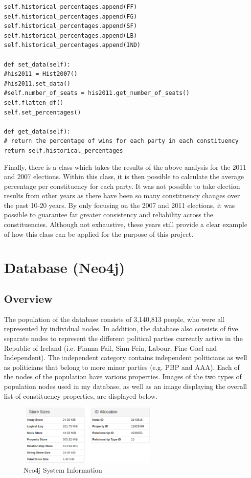 \begin{verbatim}
self.historical_percentages.append(FF)
self.historical_percentages.append(FG)
self.historical_percentages.append(SF)
self.historical_percentages.append(LB)
self.historical_percentages.append(IND)

def set_data(self):
#his2011 = Hist2007()
#his2011.set_data()
#self.number_of_seats = his2011.get_number_of_seats()
self.flatten_df()
self.set_percentages()

def get_data(self):
# return the percentage of wins for each party in each constituency
return self.historical_percentages 
\end{verbatim}
Finally, there is a class which takes the results of the above analysis for the 2011 and 2007 elections. Within this class, it is then possible to calculate the average percentage per constituency for each party. It was not possible to take election results from other years as there have been so many constituency changes over the past 10-20 years. By only focusing on the 2007 and 2011 elections, it was possible to guarantee far greater consistency and reliability across the constituencies.  Although not exhaustive, these years still provide a clear example of how this class can be applied for the purpose of this project. 
\section{Database (Neo4j)}
\subsection{Overview}
The population of the database consists of 3,140,813 people, who were all represented by individual nodes. In addition, the database also consists of five separate nodes to represent the different political parties currently active in the Republic of Ireland (i.e. Fianna Fail, Sinn Fein, Labour, Fine Gael and Independent). The independent category contains independent politicians as well as politicians that belong to more minor parties (e.g. PBP and AAA). Each of the nodes of the population have various properties. Images of the two types of population nodes used in my database, as well as an image displaying the overall list of constituency properties, are displayed below.
	\begin{figure}[h]
		\caption{Neo4j System Information}
		\centering
		\includegraphics[width=7cm, height=3cm]{img/neo4j-monitor}
	\end{figure}
\pagebreak

